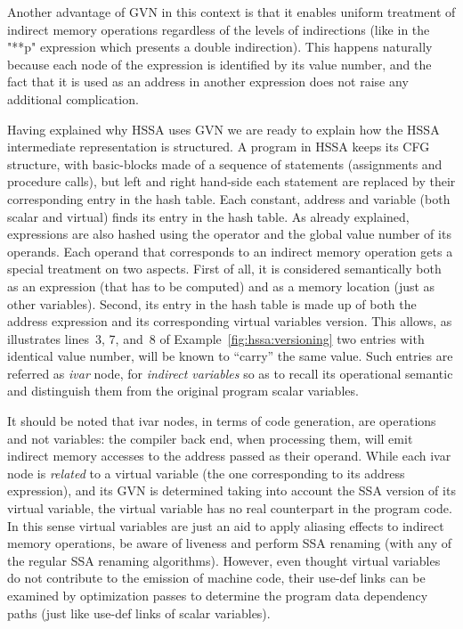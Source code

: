 Another advantage of GVN in this context is that it enables uniform treatment of indirect memory operations regardless of the levels of indirections (like in the "**p" expression which presents a double indirection).
This happens naturally because each node of the expression is identified by its value number, and the fact that it is used as an address in another expression does not raise any additional complication.

Having explained why HSSA uses GVN we are ready to explain how the HSSA intermediate representation is structured.
A program in HSSA keeps its CFG structure, with basic-blocks made of a sequence of statements (assignments and procedure calls), but left and right hand-side each statement are replaced by their corresponding entry in the hash table. 
Each constant, address and variable (both scalar and virtual) finds its entry in the hash table.
As already explained, expressions are also hashed using the operator and the global value number of its operands.
Each operand that corresponds to an indirect memory operation gets a special treatment on two aspects.
First of all, it is considered semantically both as an expression (that has to be computed) and as a memory location (just as other variables).
Second, its entry in the hash table is made up of both the address expression and its corresponding virtual variables version.
This allows, as illustrates lines~3, 7, and~8 of Example~\ref{fig:hssa:versioning} two entries with identical value number, will be known to ``carry'' the same value.
Such entries are referred as \emph{ivar} node, for \emph{indirect variables} so as to recall its operational semantic and distinguish them from the original program scalar variables. 

It should be noted that ivar nodes, in terms of code generation, are operations and not variables: the compiler back end, when processing them, will emit indirect memory accesses to the address passed as their operand.
While each ivar node is \emph{related} to a virtual variable (the one corresponding to its address expression), and its GVN is determined taking into account the SSA version of its virtual variable, the virtual variable has no real counterpart in the program code.
In this sense virtual variables are just an aid to apply aliasing effects to indirect memory operations, be aware of liveness and perform SSA renaming (with any of the regular SSA renaming algorithms).
However, even thought virtual variables do not contribute to the emission of machine code, their use-def links can be examined by optimization passes to determine the program data dependency paths (just like use-def links of scalar variables).

